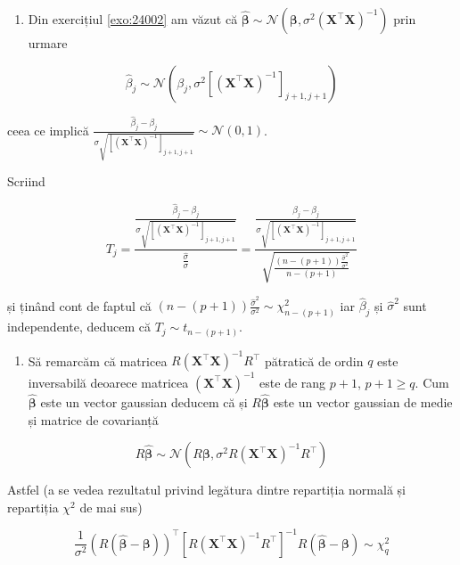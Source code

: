\documentclass[]{article}
\providecommand{\tightlist}{%
  \setlength{\itemsep}{0pt}\setlength{\parskip}{0pt}}
\newcounter{exo}[section]
\begin{document}
\begin{enumerate}
\def\labelenumi{\arabic{enumi}.}
\tightlist
\item
  Din exercițiul \ref{exo:24002} am văzut că
  \(\hat{\boldsymbol \beta}\sim\mathcal{N}(\boldsymbol \beta, \sigma^2(\boldsymbol X^\intercal\boldsymbol X)^{-1})\)
  prin urmare
\end{enumerate}

\[
\hat{\beta}_j\sim \mathcal{N}(\beta_j, \sigma^2\left[(\boldsymbol X^\intercal\boldsymbol X)^{-1}\right]_{j+1,j+1})
\]

ceea ce implică
\(\frac{\hat{\beta}_j - \beta_j}{\sigma\sqrt{\left[(\boldsymbol X^\intercal\boldsymbol X)^{-1}\right]_{j+1,j+1}}}\sim\mathcal{N}(0,1)\).

Scriind

\[
T_j = \frac{\frac{\hat{\beta}_j - \beta_j}{\sigma\sqrt{\left[(\boldsymbol X^\intercal\boldsymbol X)^{-1}\right]_{j+1,j+1}}}}{\frac{\hat{\sigma}}{\sigma}} = \frac{\frac{\hat{\beta}_j - \beta_j}{\sigma\sqrt{\left[(\boldsymbol X^\intercal\boldsymbol X)^{-1}\right]_{j+1,j+1}}}}{\sqrt{\frac{(n - (p+1))\frac{\hat{\sigma}^2}{\sigma^2}}{n-(p+1)}}}
\]

și ținând cont de faptul că
\((n-(p+1))\frac{\hat{\sigma}^2}{\sigma^2}\sim\chi^2_{n-(p+1)}\) iar
\(\hat{\beta}_j\) și \(\hat{\sigma}^2\) sunt independente, deducem că
\(T_j \sim t_{n-(p+1)}\).

\begin{enumerate}
\def\labelenumi{\arabic{enumi}.}
\setcounter{enumi}{1}
\tightlist
\item
  Să remarcăm că matricea
  \(R(\boldsymbol X^\intercal\boldsymbol X)^{-1}R^\intercal\) pătratică
  de ordin \(q\) este inversabilă deoarece matricea
  \((\boldsymbol X^\intercal\boldsymbol X)^{-1}\) este de rang \(p+1\),
  \(p+1\geq q\). Cum \(\hat{\boldsymbol \beta}\) este un vector gaussian
  deducem că și \(R\hat{\boldsymbol \beta}\) este un vector gaussian de
  medie și matrice de covarianță
\end{enumerate}

\[
R\hat{\boldsymbol \beta}\sim\mathcal{N}\left(R\boldsymbol \beta, \sigma^2 R(\boldsymbol X^\intercal\boldsymbol X)^{-1} R^\intercal\right)
\]

Astfel (a se vedea rezultatul privind legătura dintre repartiția normală
și repartiția \(\chi^2\) de mai sus)

\[
\frac{1}{\sigma^2}\left(R(\hat{\boldsymbol\beta} - \boldsymbol\beta)\right)^\intercal\left[R(\boldsymbol X^\intercal\boldsymbol X)^{-1}R^\intercal\right]^{-1}R(\hat{\boldsymbol\beta} - \boldsymbol\beta)\sim \chi^2_q
\]
\end{document}

